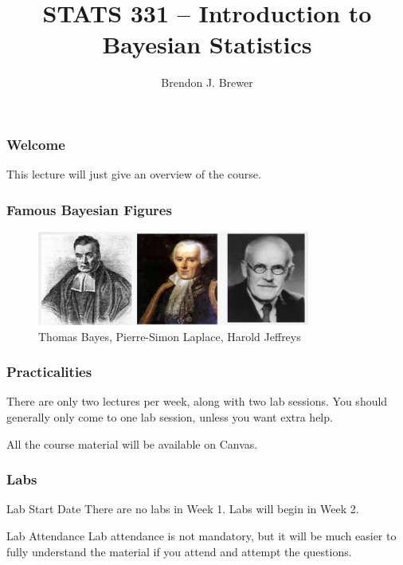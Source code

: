 \documentclass{beamer}
\author{Brendon J. Brewer}
\title{STATS 331 -- Introduction to Bayesian Statistics}
\institute{The University of Auckland}
\date{}
\begin{document}
\frame{\titlepage}

\begin{frame}
\frametitle{Welcome}
This lecture will just give an overview of the course.

\end{frame}


\begin{frame}
\frametitle{Famous Bayesian Figures}

\begin{figure}[!h]
\centering
\includegraphics[width=0.8\textwidth]{images/people.png}
\caption{Thomas Bayes, Pierre-Simon Laplace, Harold Jeffreys
\label{fig:people}}
\end{figure}

\end{frame}


\begin{frame}
\frametitle{Practicalities}
There are only two lectures per week, along with two lab sessions.
You should generally only come to one lab session, unless you want extra help. \\[1em]
\pause

All the course material will be available on Canvas.

\end{frame}


\begin{frame}
\frametitle{Labs}

\begin{alertblock}{Lab Start Date}
There are no labs in Week 1. Labs will begin in Week 2.
\end{alertblock}\pause

\begin{alertblock}{Lab Attendance}
Lab attendance is not mandatory, but it will be much easier to
fully understand the material if you attend and attempt the questions.
\end{alertblock}

\end{frame}
\end{document}

